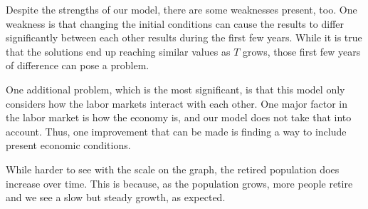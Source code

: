 \documentclass[11pt]{amsart}
\begin{document}
Despite the strengths of our model, there are some weaknesses present, too. One weakness is that
changing the initial conditions can cause the results to differ significantly between each other results during the first few years.
While it is true that the solutions end up reaching similar values as $T$ grows, those first few years of difference can pose a problem.

One additional problem, which is the most significant, is that this model only considers how the labor markets interact
with each other. One major factor in the labor market is how the economy is, and our model does not take that into account.
Thus, one improvement that can be made is finding a way to include present economic conditions.

While harder to see with the scale on the graph, the retired population does increase over time. 
This is because, as the population grows, more people retire and we see a slow but steady growth, as expected.



\newpage 


\end{document}

